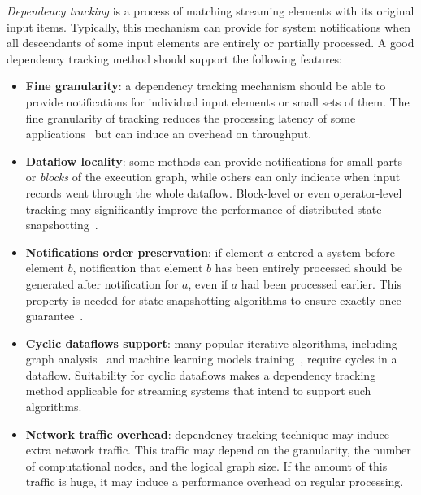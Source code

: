 {\em Dependency tracking} is a process of matching streaming elements with its original input items. Typically, this mechanism can provide for system notifications when all descendants of some input elements are entirely or partially processed. A good dependency tracking method should support the following features:
\begin{itemize}
    \item {\bf Fine granularity}: a dependency tracking mechanism should be able to provide notifications for individual input elements or small sets of them. The fine granularity of tracking reduces the processing latency of some applications~\cite{we2018adbis} but can induce an overhead on throughput.
    \item {\bf Dataflow locality}: some methods can provide notifications for small parts or {\em blocks} of the execution graph, while others can only indicate when input records went through the whole dataflow. Block-level or even operator-level tracking may significantly improve the performance of distributed state snapshotting~\cite{Carbone:2017:SMA:3137765.3137777, 2015arXiv150608603C}.
    \item {\bf Notifications order preservation}: if element $a$ entered a system before element $b$, notification that element $b$ has been entirely processed should be generated after notification for $a$, even if $a$ had been processed earlier. This property is needed for state snapshotting algorithms to ensure exactly-once guarantee~\cite{2015arXiv150608603C}.
    \item {\bf Cyclic dataflows support}: many popular iterative algorithms, including graph analysis~\cite{xu2016efficient} and machine learning models training~\cite{morales2015samoa}, require cycles in a dataflow. Suitability for cyclic dataflows makes a dependency tracking method applicable for streaming systems that intend to support such algorithms.
    \item {\bf Network traffic overhead}: dependency tracking technique may induce extra network traffic. This traffic may depend on the granularity, the number of computational nodes, and the logical graph size. If the amount of this traffic is huge, it may induce a performance overhead on regular processing.
\end{itemize}

